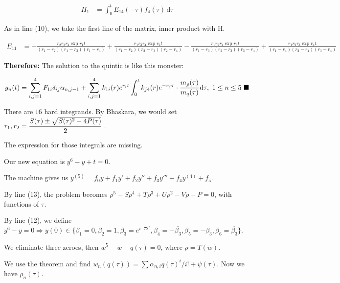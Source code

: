 \documentclass[12pt]{article}
\begin{document}
\normalsize

\begin{align}
H_1 &= \int_0^t E_{14}(-\tau) f_4(\tau)\,\mathrm{d}\tau
\end{align}

As in line (10), we take the first line of the matrix, inner product with H.

\footnotesize

\begin{align}
E_{11} &= - \frac{r_2 r_3 r_4 \exp r_1 t}{(r_1 - r_2)(r_1 - r_3)(r_1 - r_4)} +\frac{r_1 r_3 r_4 \exp r_2 t}{(r_1 - r_2)(r_2 - r_3)(r_2 - r_4)} - \frac{r_1 r_2 r_4 \exp r_3 t}{(r_1 - r_3)(r_2 - r_3)(r_3 - r_4)} +\frac{r_1 r_2 r_3\exp r_4 t}{(r_1 - r_4)(r_2 - r_4)(r_3 - r_4)} \nonumber 
\end{align}

\Large

\textbf{Therefore:} The solution to the quintic is like this monster:

\begin{align}
y_n(t) = \sum_{i,j=1}^4 F_{1i} \delta_{ij} \alpha_{n,j-1} + \sum_{i,j=1}^4 k_{1i}(r) e^{r_i t} \int_0^t k_{j4}(r) e^{-r_j\tau} \cdot \cfrac{m_p(\tau)}{m_q(\tau)}\,\mathrm{d}\tau,\,\,1\le n \le 5\,\,\blacksquare \nonumber
\end{align}

\normalsize

There are $16$ hard integrands. By Bhaskara, we would set $r_1,r_2 = \cfrac{S(\tau) \pm \sqrt{S(\tau)^2 - 4P(\tau)}}{2}$ . 

The expression for those integrals are missing.

\vspace{100mm}

Our new equation is $y^6 - y + t = 0$. 

The machine gives us $y^{(5)} = f_0 y + f_1 y' + f_2 y'' + f_3 y''' + f_4 y^{(4)} + f_5$.

By line (13), the problem becomes $\rho^5 - S\rho^4 + T\rho^3 + U\rho^2 - V\rho + P = 0$, with functions of $\tau$.

By line (12), we define $y^6 - y = 0 \Rightarrow y(0) \in \{\beta_1 = 0, \beta_2 = 1, \beta_3 = e^{i\cdot 72^\circ}, \beta_4 = -\overline{\beta_3}, \beta_5 = -\beta_3, \beta_6 = \overline{\beta_3} \}$. 

We eliminate three zeroes, then $w^5 - w + q(\tau) = 0$, where $\rho = T(w)$.

We use the theorem and find $w_n(q(\tau)) = \sum \alpha_{n,i} q(\tau)^i/i! + \psi(\tau)$. Now we have $\rho_n(\tau)$.
\end{document}
